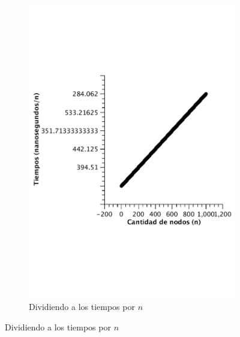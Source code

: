 \begin{figure}[H]
\begin{subfigure}[b]{0.45\textwidth}
                \includegraphics[width=\textwidth]{imagenes/vacio-listas-2.pdf}
                \caption{Dividiendo a los tiempos por $n$}
        \end{subfigure}
\end{figure}


